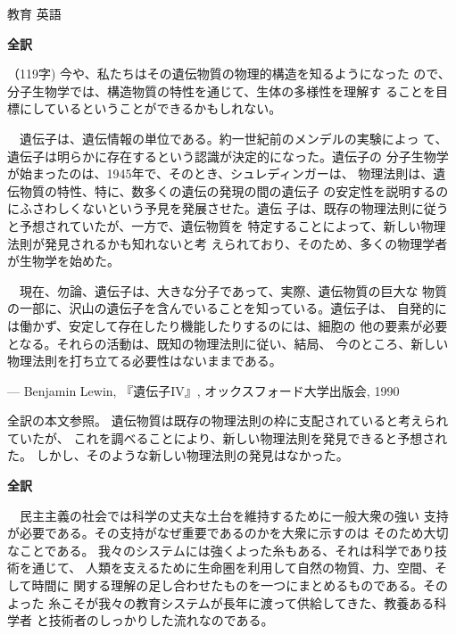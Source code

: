 \documentclass[fleqn]{jbook}
\begin{document}
\begin{answer}{教育 英語}{}
\begin{subanswers}
\SubAnswer  

{\bf 全訳}

    （119字) 今や、私たちはその遺伝物質の物理的構造を知るようになった
    ので、分子生物学では、構造物質の特性を通じて、生体の多様性を理解す
    ることを目標にしているということができるかもしれない。

     　遺伝子は、遺伝情報の単位である。約一世紀前のメンデルの実験によっ
     て、遺伝子は明らかに存在するという認識が決定的になった。遺伝子の
     分子生物学が始まったのは、1945年で、そのとき、シュレディンガーは、
     物理法則は、遺伝物質の特性、特に、数多くの遺伝の発現の間の遺伝子
     の安定性を説明するのにふさわしくないという予見を発展させた。遺伝
     子は、既存の物理法則に従うと予想されていたが、一方で、遺伝物質を
     特定することによって、新しい物理法則が発見されるかも知れないと考
     えられており、そのため、多くの物理学者が生物学を始めた。

      　現在、勿論、遺伝子は、大きな分子であって、実際、遺伝物質の巨大な
      物質の一部に、沢山の遺伝子を含んでいることを知っている。遺伝子は、
      自発的には働かず、安定して存在したり機能したりするのには、細胞の
      他の要素が必要となる。それらの活動は、既知の物理法則に従い、結局、
      今のところ、新しい物理法則を打ち立てる必要性はないままである。
%
  \begin{flushright}
    --- Benjamin Lewin, 『遺伝子IV』, オックスフォード大学出版会, 1990  
  \end{flushright}

  \begin{subsubanswers}
  \SubSubAnswer
    全訳の本文参照。
  \SubSubAnswer
    遺伝物質は既存の物理法則の枠に支配されていると考えられていたが、
    これを調べることにより、新しい物理法則を発見できると予想された。
    しかし、そのような新しい物理法則の発見はなかった。
  \end{subsubanswers}



\SubAnswer
  {\bf 全訳}

  　民主主義の社会では科学の丈夫な土台を維持するために一般大衆の強い
  支持が必要である。その支持がなぜ重要であるのかを大衆に示すのは
  そのため大切なことである。
  我々のシステムには強くよった糸もある、それは科学であり技術を通じて、
  人類を支えるために生命圏を利用して自然の物質、力、空間、そして時間に
  関する理解の足し合わせたものを一つにまとめるものである。そのよった
  糸こそが我々の教育システムが長年に渡って供給してきた、教養ある科学者
  と技術者のしっかりした流れなのである。


\end{subanswers}
\end{answer}
\end{document}
